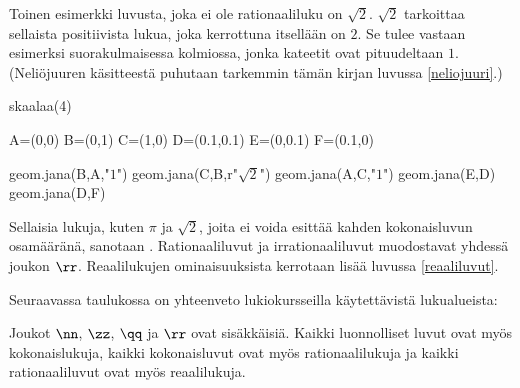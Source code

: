 Toinen esimerkki luvusta, joka ei ole rationaaliluku on $\sqrt{2}$. $\sqrt{2}$ tarkoittaa sellaista positiivista lukua, joka kerrottuna itsellään on $2$. Se tulee vastaan esimerksi suorakulmaisessa kolmiossa, jonka kateetit ovat pituudeltaan $1$. (Neliöjuuren käsitteestä puhutaan tarkemmin tämän kirjan luvussa \ref{neliojuuri}.)

\begin{kuva}
	skaalaa(4)

	A=(0,0)
	B=(0,1)
	C=(1,0)
	D=(0.1,0.1)
	E=(0,0.1)
	F=(0.1,0)

	geom.jana(B,A,"$1$")
	geom.jana(C,B,r"$\sqrt{2}$")
	geom.jana(A,C,"$1$")
	geom.jana(E,D)
	geom.jana(D,F)
\end{kuva}

Sellaisia lukuja, kuten $\pi$ ja $\sqrt{2}$, joita ei voida esittää kahden kokonaisluvun osamääränä, sanotaan . Rationaaliluvut ja irrationaaliluvut muodostavat yhdessä  joukon $\rr$. Reaalilukujen ominaisuuksista kerrotaan lisää luvussa \ref{reaaliluvut}.

Seuraavassa taulukossa on yhteenveto lukiokursseilla käytettävistä lukualueista:

Joukot $\nn$, $\zz$, $\qq$ ja $\rr$ ovat sisäkkäisiä. Kaikki luonnolliset luvut ovat myös kokonaislukuja,
kaikki kokonaisluvut ovat myös rationaalilukuja ja kaikki rationaaliluvut ovat myös reaalilukuja.

